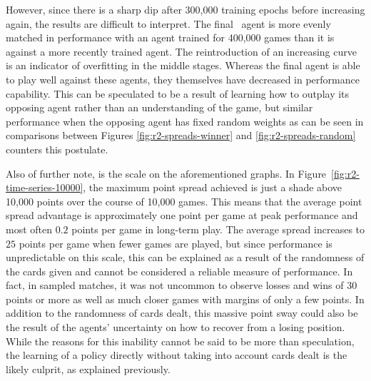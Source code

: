 However,
since there is a sharp dip after 300,000 training epochs before increasing
again,
the results are difficult to interpret.
%
The final \learned\ agent is more evenly matched in performance with an agent
trained for 400,000 games
than it is against a more recently trained agent.
%
The reintroduction of an increasing curve
is an indicator of overfitting in the middle stages.
%
Whereas the final agent is able to play well against these agents,
they themselves have decreased in performance capability.
%
This can be speculated to be a result of learning how to outplay its opposing agent
rather than an understanding of the game,
but similar performance when the opposing agent
has fixed random weights\textemdash
as can be seen in comparisons between Figures
\ref{fig:r2-spreads-winner} and \ref{fig:r2-spreads-random}\textemdash
counters this postulate.

Also of further note, is the scale on the aforementioned graphs.
%
In Figure~\ref{fig:r2-time-series-10000},
the maximum point spread achieved is just a shade above 10,000 points
over the course of 10,000 games.
%
This means that the average point spread advantage is approximately 
one point per game at peak performance\textemdash
and most often $0.2$ points per game\textemdash
in long-term play.
%
The average spread increases to $25$ points per game when fewer games are 
played,
but since performance is unpredictable on this scale,
this can be explained as a result of the randomness of the cards given
and cannot be considered a reliable measure of performance.
%
In fact,
in sampled matches,
it was not uncommon to observe losses and wins of 30 points or more
as well as much closer games with margins of only a few points.
%
In addition to the randomness of cards dealt,
this massive point sway could also be the result of the agents' uncertainty on 
how to recover from a losing position.
%
While the reasons for this inability cannot be said to be more than speculation,
the learning of a policy directly without taking into account cards dealt
is the likely culprit,
as explained previously.

